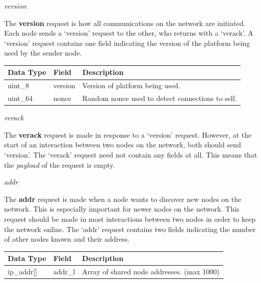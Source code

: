 \documentclass{article}
\begin{document}
\begin{center}
    \Large \textit{version}
\end{center}
The \textbf{version} request is how all communications on the network are initiated. Each node sends a `version' request to the other, who returns with a `verack'. A `version' request contains one field indicating the version of the platform being used by the sender node.
\begin{table}[H]
\centering
\begin{tabular}{|p{1.3cm}|p{2.5cm}|p{5.5cm}|}
\hline
\rowcolor{tblgrey}
Data Type   & Field       & Description\\ \hline
uint\_8     & version     & Version of platform being used.                          \\ \hline
uint\_64    & nonce       & Random nonce used to detect connections to self.                   \\ \hline
\end{tabular}
\end{table}

\begin{center}
    \Large \textit{verack}
\end{center}
The \textbf{verack} request is made in response to a `version' request. However, at the start of an interaction between two nodes on the network, both should send `version'. The `verack' request need not contain any fields at all. This means that the \textit{payload} of the request is empty.

\begin{center}
    \Large \textit{addr}
\end{center}
The \textbf{addr} request is made when a node wants to discover new nodes on the network. This is especially important for newer nodes on the network. This request should be made in most interactions between two nodes in order to keep the network online. The `addr' request contains two fields indicating the number of other nodes known and their address.
\begin{table}[H]
\centering
\begin{tabular}{|p{1.5cm}|p{2.5cm}|p{5.5cm}|}
\hline
\rowcolor{tblgrey}
Data Type   & Field       & Description\\ \hline
ip\_addr[\hspace{0.05cm}] & addr\_l       & Array of shared node addresses. (max 1000)                               \\ \hline
\end{tabular}
\end{table}
\end{document}
